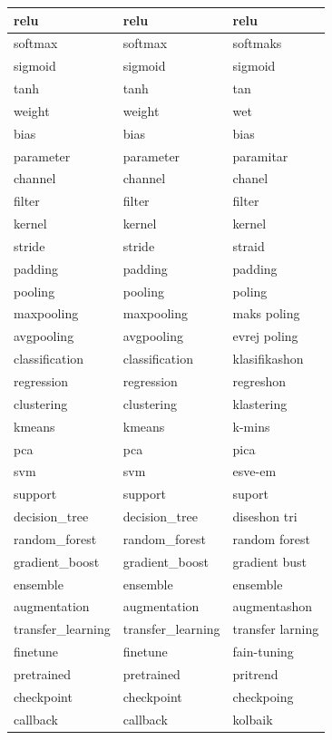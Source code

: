 \documentclass[10pt,twocolumn,letterpaper]{article}
\begin{document}
\begin{longtable}{|p{4cm}|p{4cm}|p{4cm}|}
relu & relu & relu \\ \hline
softmax & softmax & softmaks \\ \hline
sigmoid & sigmoid & sigmoid \\ \hline
tanh & tanh & tan \\ \hline
weight & weight & wet \\ \hline
bias & bias & bias \\ \hline
parameter & parameter & paramitar \\ \hline
channel & channel & chanel \\ \hline
filter & filter & filter \\ \hline
kernel & kernel & kernel \\ \hline
stride & stride & straid \\ \hline
padding & padding & padding \\ \hline
pooling & pooling & poling \\ \hline
maxpooling & maxpooling & maks poling \\ \hline
avgpooling & avgpooling & evrej poling \\ \hline
classification & classification & klasifikashon \\ \hline
regression & regression & regreshon \\ \hline
clustering & clustering & klastering \\ \hline
kmeans & kmeans & k-mins \\ \hline
pca & pca & pica \\ \hline
svm & svm & esve-em \\ \hline
support & support & suport \\ \hline
decision\_tree & decision\_tree & diseshon tri \\ \hline
random\_forest & random\_forest & random forest \\ \hline
gradient\_boost & gradient\_boost & gradient bust \\ \hline
ensemble & ensemble & ensemble \\ \hline
augmentation & augmentation & augmentashon \\ \hline
transfer\_learning & transfer\_learning & transfer larning \\ \hline
finetune & finetune & fain-tuning \\ \hline
pretrained & pretrained & pritrend \\ \hline
checkpoint & checkpoint & checkpoing \\ \hline
callback & callback & kolbaik \\ \hline

\end{longtable}
\end{document}
